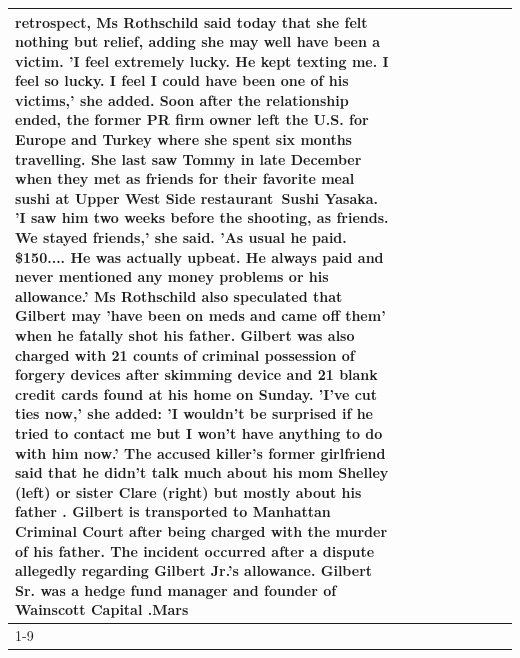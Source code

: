 \begin{table}[H]
\begin{tabular}{lllrlllll}
retrospect, Ms Rothschild said today that she felt nothing but relief, adding she may well have been a victim. 'I feel extremely lucky. He kept texting me. I feel so lucky. I feel I could have been one of his victims,' she added. Soon after the relationship ended, the former PR firm owner left the U.S. for Europe and Turkey where she spent six months  travelling. She last saw Tommy in late December when they met as friends for their favorite meal sushi at Upper West Side restaurant Sushi Yasaka. 'I saw him two weeks before the shooting, as friends. We stayed friends,' she said. 'As usual he paid. \$150.... He was actually upbeat. He always paid and never mentioned any money problems or his allowance.' Ms Rothschild also speculated that Gilbert may 'have been on meds and came off them' when he fatally shot his father. Gilbert was also charged with 21 counts of criminal possession of forgery devices after skimming device and 21 blank credit cards found at his home on Sunday. 'I've cut ties now,' she added: 'I wouldn’t be surprised if he tried to contact me but I won’t have anything to do with him now.' The accused killer's former girlfriend said that he didn't talk much about his mom Shelley (left) or sister Clare (right) but mostly about his father . Gilbert is transported to Manhattan Criminal Court  after being charged with the murder of his father. The incident occurred after a dispute allegedly regarding Gilbert Jr.'s allowance. Gilbert Sr. was a hedge fund manager and founder of Wainscott Capital .Mars \\
\cline{1-9}

\end{tabular}
\end{table}
